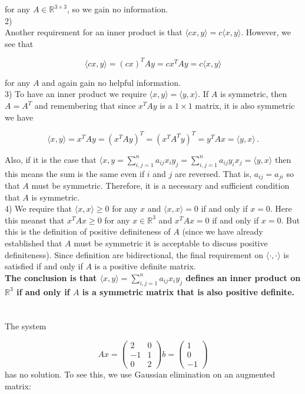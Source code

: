 \documentclass[11pt]{article}
\begin{document}
for any $A \in \mathbb{R}^{3\times 3}$, so we gain no information.\\

2)\\

Another requirement for an inner product is that $\langle cx, y \rangle = c\langle x , y \rangle$. However, we see that

$$\langle cx, y \rangle = (cx)^TAy = cx^TAy = c\langle x, y \rangle$$

for any $A$ and again gain no helpful information.\\

3) To have an inner product we require $\langle x, y \rangle = \langle y, x \rangle$. If $A$ is symmetric, then $A = A^T$ and remembering that since $x^TAy$ is a $1 \times 1$ matrix, it is also symmetric we have 

$$\langle x, y \rangle =  x^TAy = (x^TAy)^T = (x^TA^Ty)^T = y^TAx = \langle y, x \rangle \,.$$

Also, if it is the case that $\langle x, y = \sum_{i,j = 1}^n a_{ij}x_iy_j = \sum_{i,j = 1}^n a_{ij}y_ix_j = \langle y, x \rangle$ then this means the sum is the same even if $i$ and $j$ are reversed. That is, $a_{ij} = a_{ji}$ so that $A$ must be symmetric. Therefore, it is a necessary and sufficient condition that $A$ is symmetric.\\

4) We require that $\langle x, x \rangle \geq 0$ for any $x$ and $\langle x, x \rangle = 0$ if and only if $x = 0$. Here this meanst that $x^TAx \geq 0$ for any $x \in \mathbb{R}^3$ and $x^TAx = 0$ if and only if $x = 0$. But this is the definition of positive definiteness of $A$ (since we have already established that $A$ must be symmetric it is acceptable to discuss positive definiteness). Since definition are bidirectional, the final requirement on $\langle \cdot, \cdot \rangle$ is satisfied if and only if $A$ is a positive definite matrix. \\

{\bf The conclusion is that $\langle x, y \rangle = \sum_{i,j = 1}^n a_{ij}x_iy_j$ defines an inner product on $\mathbb{R}^3$ if and only if $A$ is a symmetric matrix that is also positive definite.}

\section{}

The system

$$Ax = \begin{pmatrix} 2&0\\-1&1\\0&2 \end{pmatrix}b = \begin{pmatrix}
1\\0\\-1 \end{pmatrix}$$
has no solution. To see this, we use Gaussian elimination on an augmented matrix:
\end{document}
